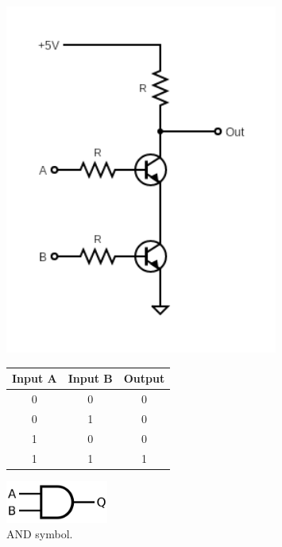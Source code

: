 	\begin{figure}[H]
		\begin{minipage}{0.5\textwidth}
			\centering
			\includegraphics[width=0.8\textwidth]{figures/circuits/AND.png}
			\label{fig:AND_circuit} 
		\end{minipage}
		\begin{minipage}{0.5\textwidth}
			\centering
			\begin{tabular}{|c|c|c|}
				\hline
				Input A & Input B & Output \\
				\hline
				0 & 0 & 0 \\
				0 & 1 & 0 \\
				1 & 0 & 0 \\
				1 & 1 & 1 \\
				\hline
			\end{tabular}
			\label{tab:AND_table}
		\end{minipage}
	\end{figure}

	\begin{figure}[H]
	    \centering
	    \includegraphics[width=0.3\textwidth]{figures/symbols/AND.png}
	    \caption{AND symbol.}
	    \label{fig:AND_sym} 
	\end{figure}